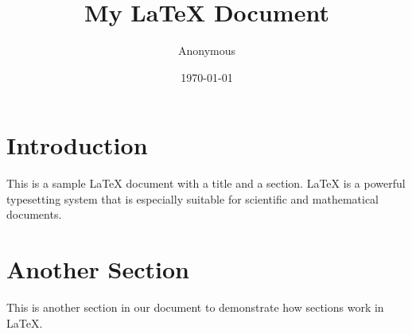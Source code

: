 \documentclass{article}
\title{My LaTeX Document}
\author{Anonymous}
\date{\today}
\begin{document}
\maketitle
\section{Introduction}
This is a sample LaTeX document with a title and a section. LaTeX is a powerful typesetting system that is especially suitable for scientific and mathematical documents.

\section{Another Section}
This is another section in our document to demonstrate how sections work in LaTeX.
\end{document}
